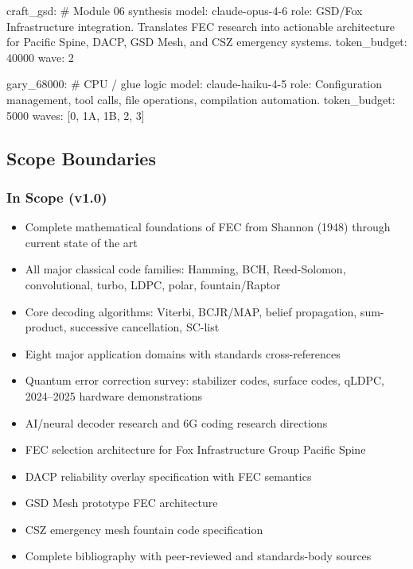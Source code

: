 \documentclass[11pt,letterpaper]{article}
\begin{document}
\begin{asciibox}
  craft_gsd:                       # Module 06 synthesis
    model: claude-opus-4-6
    role: GSD/Fox Infrastructure integration.
          Translates FEC research into actionable
          architecture for Pacific Spine, DACP,
          GSD Mesh, and CSZ emergency systems.
    token_budget: 40000
    wave: 2

  gary_68000:                      # CPU / glue logic
    model: claude-haiku-4-5
    role: Configuration management, tool calls,
          file operations, compilation automation.
    token_budget: 5000
    waves: [0, 1A, 1B, 2, 3]
\end{asciibox}

\subsection{Scope Boundaries}

\subsubsection{In Scope (v1.0)}

\begin{itemize}[leftmargin=*]
  \item Complete mathematical foundations of FEC from Shannon (1948) through current state of the art
  \item All major classical code families: Hamming, BCH, Reed-Solomon, convolutional, turbo, LDPC, polar, fountain/Raptor
  \item Core decoding algorithms: Viterbi, BCJR/MAP, belief propagation, sum-product, successive cancellation, SC-list
  \item Eight major application domains with standards cross-references
  \item Quantum error correction survey: stabilizer codes, surface codes, qLDPC, 2024--2025 hardware demonstrations
  \item AI/neural decoder research and 6G coding research directions
  \item FEC selection architecture for Fox Infrastructure Group Pacific Spine
  \item DACP reliability overlay specification with FEC semantics
  \item GSD Mesh prototype FEC architecture
  \item CSZ emergency mesh fountain code specification
  \item Complete bibliography with peer-reviewed and standards-body sources
\end{itemize}
\end{document}
